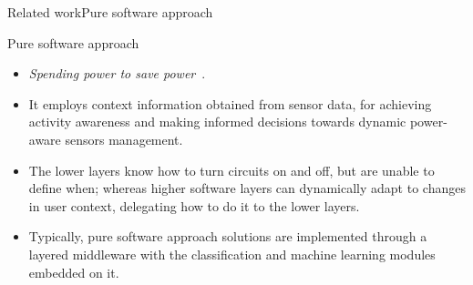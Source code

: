 \documentclass[8pt,xcolor={dvipsnames},handout]{beamer}
\begin{document}
\begin{frame}{Related work}{Pure software approach}
\begin{exampleblock}{Pure software approach}
\begin{itemize}
  \item \emph{Spending power to save power}~\cite{Ranganathan2010}.
  \item It employs context information obtained from sensor data, for achieving activity awareness and making informed decisions towards dynamic power-aware sensors management.
  \item The lower layers know how to turn circuits on and off, but are unable to define when; whereas higher software layers can dynamically adapt to changes in user context, delegating how to do it to the lower layers.
  \item Typically, pure software approach solutions are implemented through a layered middleware with the classification and machine learning modules embedded on it.
\end{itemize}
\end{exampleblock}
\end{frame}
\end{document}
